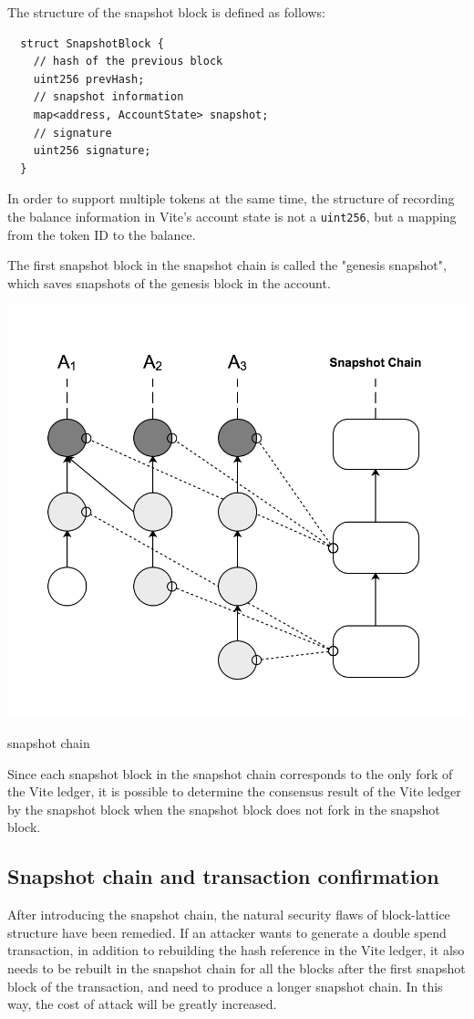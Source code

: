 \documentclass[UTF8,nofonts]{article}
\makeatletter
\newenvironment{figurehere}
 {\def\@captype{figure}}
 {}
\makeatother
\begin{document}
\begin{multicols}{2}
The structure of the snapshot block is defined as follows:
\begin{verbatim}
  struct SnapshotBlock {
    // hash of the previous block   
    uint256 prevHash;
    // snapshot information
    map<address, AccountState> snapshot;
    // signature
    uint256 signature;
  }
\end{verbatim}

In order to support multiple tokens at the same time, the structure of recording the balance information in Vite's account state is not a \texttt{uint256}, but a mapping from the token ID to the balance.

The first snapshot block in the snapshot chain is called the "genesis snapshot", which saves snapshots of the genesis block in the account.

\begin{center}
\begin{figurehere}
\includegraphics[width=.7\linewidth]{image/snapshotchain.png}
\caption{snapshot chain}
\end{figurehere}
\end{center}

Since each snapshot block in the snapshot chain corresponds to the only fork of the Vite ledger, it is possible to determine the consensus result of the Vite ledger by the snapshot block when the snapshot block does not fork in the snapshot block.

\subsection{Snapshot chain and transaction confirmation}

After introducing the snapshot chain, the natural security flaws of block-lattice structure have been remedied. If an attacker wants to generate a double spend transaction, in addition to rebuilding the hash reference in the Vite ledger, it also needs to be rebuilt in the snapshot chain for all the blocks after the first snapshot block of the transaction, and need to produce a longer snapshot chain. In this way, the cost of attack will be greatly increased.


\end{multicols}
\end{document}
